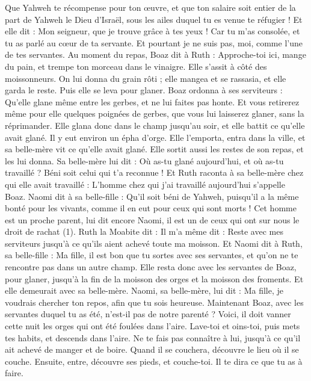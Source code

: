\begin{multicols}{2}
Que Yahweh te récompense pour ton œuvre, et que ton salaire soit entier de la part de Yahweh le Dieu d'Israël, sous les ailes duquel tu es venue te réfugier !
Et elle dit : Mon seigneur, que je trouve grâce à tes yeux ! Car tu m'as consolée, et tu as parlé au cœur de ta servante. Et pourtant je ne suis pas, moi, comme l'une de tes servantes.
Au moment du repas, Boaz dit à Ruth : Approche-toi ici, mange du pain, et trempe ton morceau dans le vinaigre. Elle s'assit à côté des moissonneurs. On lui donna du grain rôti ; elle mangea et se rassasia, et elle garda le reste.
Puis elle se leva pour glaner. Boaz ordonna à ses serviteurs : Qu'elle glane même entre les gerbes, et ne lui faites pas honte.
Et vous retirerez même pour elle quelques poignées de gerbes, que vous lui laisserez glaner, sans la réprimander.
Elle glana donc dans le champ jusqu'au soir, et elle battit ce qu'elle avait glané. Il y eut environ un épha d'orge.
Elle l'emporta, entra dans la ville, et sa belle-mère vit ce qu'elle avait glané. Elle sortit aussi les restes de son repas, et les lui donna.
Sa belle-mère lui dit : Où as-tu glané aujourd'hui, et où as-tu travaillé ? Béni soit celui qui t'a reconnue ! Et Ruth raconta à sa belle-mère chez qui elle avait travaillé : L'homme chez qui j'ai travaillé aujourd'hui s’appelle Boaz.
Naomi dit à sa belle-fille : Qu'il soit béni de Yahweh, puisqu'il a la même bonté pour les vivants, comme il en eut pour ceux qui sont morts ! Cet homme est un proche parent, lui dit encore Naomi, il est un de ceux qui ont sur nous le droit de rachat (1).
Ruth la Moabite dit : Il m'a même dit : Reste avec mes serviteurs jusqu'à ce qu'ils aient achevé toute ma moisson.
Et Naomi dit à Ruth, sa belle-fille : Ma fille, il est bon que tu sortes avec ses servantes, et qu'on ne te rencontre pas dans un autre champ.
Elle resta donc avec les servantes de Boaz, pour glaner, jusqu'à la fin de la moisson des orges et la moisson des froments. Et elle demeurait avec sa belle-mère.
\VerseOne{}Naomi, sa belle-mère, lui dit : Ma fille, je voudrais chercher ton repos, afin que tu sois heureuse.
Maintenant Boaz, avec les servantes duquel tu as été, n'est-il pas de notre parenté ? Voici, il doit vanner cette nuit les orges qui ont été foulées dans l'aire.
Lave-toi et oins-toi, puis mets tes habits, et descends dans l'aire. Ne te fais pas connaître à lui, jusqu'à ce qu'il ait achevé de manger et de boire.
Quand il se couchera, découvre le lieu où il se couche. Ensuite, entre, découvre ses pieds, et couche-toi. Il te dira ce que tu as à faire.

\end{multicols}
